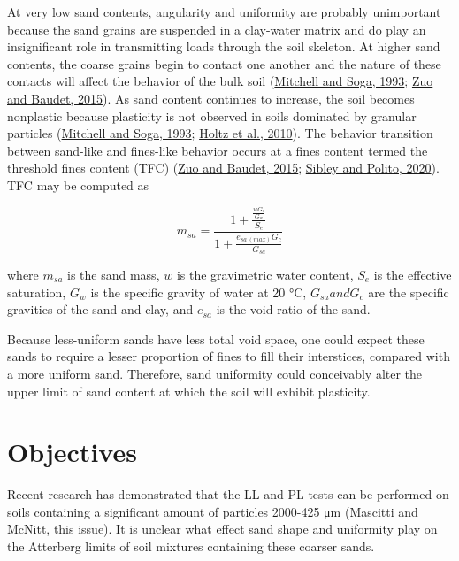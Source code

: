 \documentclass[
  letterpaper,
]{article}
\begin{document}
At very low sand contents, angularity and uniformity are probably unimportant because the sand grains are suspended in a clay-water matrix and do play an insignificant role in transmitting loads through the soil skeleton.
At higher sand contents, the coarse grains begin to contact one another and the nature of these contacts will affect the behavior of the bulk soil (\protect\hyperlink{ref-Mitchell1993}{Mitchell and Soga, 1993}; \protect\hyperlink{ref-Zuo2015}{Zuo and Baudet, 2015}).
As sand content continues to increase, the soil becomes nonplastic because plasticity is not observed in soils dominated by granular particles (\protect\hyperlink{ref-Mitchell1993}{Mitchell and Soga, 1993}; \protect\hyperlink{ref-Holtz2010}{Holtz et al., 2010}).
The behavior transition between sand-like and fines-like behavior occurs at a fines content termed the threshold fines content (TFC) (\protect\hyperlink{ref-Zuo2015}{Zuo and Baudet, 2015}; \protect\hyperlink{ref-Sibley2020}{Sibley and Polito, 2020}).
TFC may be computed as

\begin{equation}
m_{sa} = \frac{1 +  \frac{\frac{w G_c }{G_w}}{S_e}}{1 + \frac{e_{sa~(max)} G_c}{G_{sa}}}
\label{eq:tfc-equation}
\end{equation}

where \(m_{sa}\) is the sand mass, \(w\) is the gravimetric water content, \(S_e\) is the effective saturation, \(G_w\) is the specific gravity of water at 20 °C, \(G_{sa} and G_c\) are the specific gravities of the sand and clay, and \(e_{sa}\) is the void ratio of the sand.

Because less-uniform sands have less total void space, one could expect these sands to require a lesser proportion of fines to fill their interstices, compared with a more uniform sand.
Therefore, sand uniformity could conceivably alter the upper limit of sand content at which the soil will exhibit plasticity.

\hypertarget{objectives}{%
\section{Objectives}\label{objectives}}

Recent research has demonstrated that the LL and PL tests can be performed on soils containing a significant amount of particles 2000-425 μm (Mascitti and McNitt, this issue).
It is unclear what effect sand shape and uniformity play on the Atterberg limits of soil mixtures containing these coarser sands.
\end{document}
